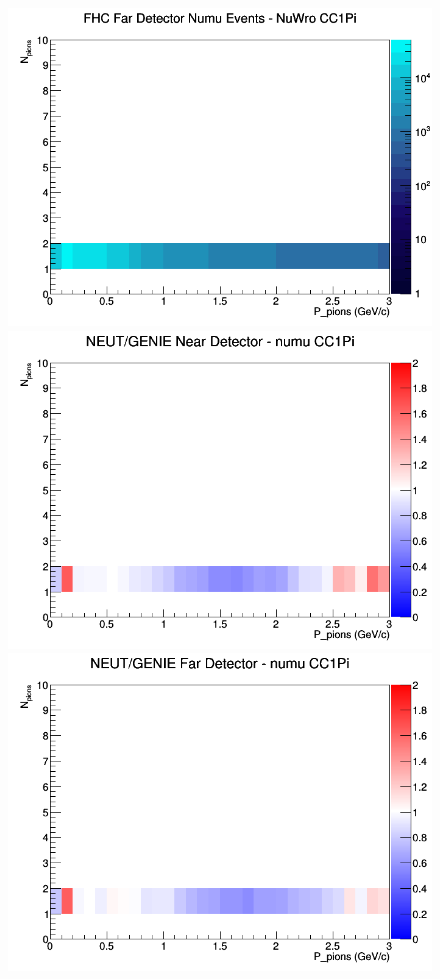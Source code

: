 \documentclass[12pt]{article}
\begin{document}
\begin{figure}[h]
\endminipage
{}
\includegraphics[width=\linewidth]{N_P/nominal/pions/CC1Pi_FHC_FD_numu_N_P_NuWro.png}
\endminipage
\newline
{}
\includegraphics[width=\linewidth]{N_P/nominal/pions/ratios/CC1Pi_NEUT_GENIE_numu_near_N_P.png}
\endminipage
{}
\includegraphics[width=\linewidth]{N_P/nominal/pions/ratios/CC1Pi_NEUT_GENIE_numu_far_N_P.png}

\end{figure}
\end{document}
